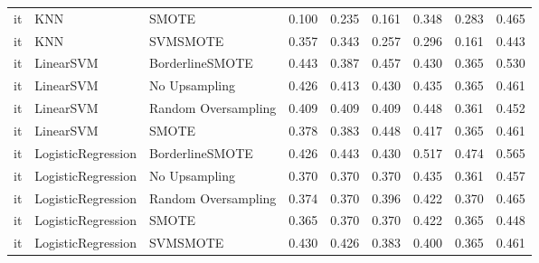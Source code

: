 \begin{tabular}{lllllllll}
      it &                          KNN &               SMOTE &     0.100 &                     0.235 &                 0.161 &                  0.348 &                                   0.283 &     0.465 \\
      it &                          KNN &            SVMSMOTE &     0.357 &                     0.343 &                 0.257 &                  0.296 &                                   0.161 &     0.443 \\
      it &                    LinearSVM &     BorderlineSMOTE &     0.443 &                     0.387 &                 0.457 &                  0.430 &                                   0.365 &     0.530 \\
      it &                    LinearSVM &       No Upsampling &     0.426 &                     0.413 &                 0.430 &                  0.435 &                                   0.365 &     0.461 \\
      it &                    LinearSVM & Random Oversampling &     0.409 &                     0.409 &                 0.409 &                  0.448 &                                   0.361 &     0.452 \\
      it &                    LinearSVM &               SMOTE &     0.378 &                     0.383 &                 0.448 &                  0.417 &                                   0.365 &     0.461 \\
      it &           LogisticRegression &     BorderlineSMOTE &     0.426 &                     0.443 &                 0.430 &                  0.517 &                                   0.474 &     0.565 \\
      it &           LogisticRegression &       No Upsampling &     0.370 &                     0.370 &                 0.370 &                  0.435 &                                   0.361 &     0.457 \\
      it &           LogisticRegression & Random Oversampling &     0.374 &                     0.370 &                 0.396 &                  0.422 &                                   0.370 &     0.465 \\
      it &           LogisticRegression &               SMOTE &     0.365 &                     0.370 &                 0.370 &                  0.422 &                                   0.365 &     0.448 \\
      it &           LogisticRegression &            SVMSMOTE &     0.430 &                     0.426 &                 0.383 &                  0.400 &                                   0.365 &     0.461 \\

\end{tabular}

